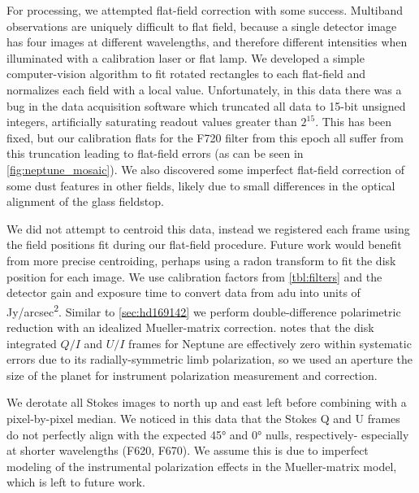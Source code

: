 For processing, we attempted flat-field correction with some success. Multiband observations are uniquely difficult to flat field, because a single detector image has four images at different wavelengths, and therefore different intensities when illuminated with a calibration laser or flat lamp. We developed a simple computer-vision algorithm to fit rotated rectangles to each flat-field and normalizes each field with a local value. Unfortunately, in this data there was a bug in the data acquisition software which truncated all data to 15-bit unsigned integers, artificially saturating readout values greater than $2^{15}$. This has been fixed, but our calibration flats for the F720 filter from this epoch all suffer from this truncation leading to flat-field errors (as can be seen in \autoref{fig:neptune_mosaic}). We also discovered some imperfect flat-field correction of some dust features in other fields, likely due to small differences in the optical alignment of the glass fieldstop.

We did not attempt to centroid this data, instead we registered each frame using the field positions fit during our flat-field procedure. Future work would benefit from more precise centroiding, perhaps using a radon transform to fit the disk position for each image. We use calibration factors from \autoref{tbl:filters} and the detector gain and exposure time to convert data from \si{adu} into units of \si{Jy/arcsec^2}. Similar to \autoref{sec:hd169142} we perform double-difference polarimetric reduction with an idealized Mueller-matrix correction. \citet{schmid_limb_2006} notes that the disk integrated $Q/I$ and $U/I$ frames for Neptune are effectively zero within systematic errors due to its radially-symmetric limb polarization, so we used an aperture the size of the planet for instrument polarization measurement and correction.

We derotate all Stokes images to north up and east left before combining with a pixel-by-pixel median. We noticed in this data that the Stokes Q and U frames do not perfectly align with the expected \ang{45} and \ang{0} nulls, respectively- especially at shorter wavelengths (F620, F670). We assume this is due to imperfect modeling of the instrumental polarization effects in the Mueller-matrix model, which is left to future work.


